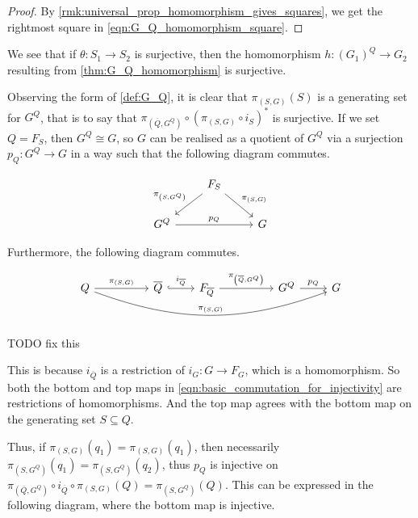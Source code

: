 \begin{proof}
	By \cref{rmk:universal_prop_homomorphism_gives_squares}, we get the rightmost square in \eqref{eqn:G_Q_homomorphism_square}.
\end{proof}

We see that if $\theta \colon S_1 \to S_2$ is surjective, then the homomorphism $h \colon (G_1)^Q \to G_2$ resulting from \cref{thm:G_Q_homomorphism} is surjective.

Observing the form of \cref{def:G_Q}, it is clear that $\pi_{(S,G)}(S)$ is a generating set for $G^Q$, that is to say that $\pi_{(\overline{Q},G^Q)} \circ \left(\pi_{(S,G)} \circ i_S \right)^*$ is surjective.
If we set $Q=F_S$, then $G^Q \cong G$, so $G$ can be realised as a quotient of $G^Q$ via a surjection $p_Q \colon G^Q \to G$ in a way such that the following diagram commutes.

\begin{equation*}
	\begin{tikzcd}
		& F_S \ar[dl, "\pi_{\left(S,G^Q\right)}"'] \ar[dr, "\pi_{\left(S,G\right)}"] &
		\\ G^Q \ar[rr, "p_Q"]  & & G
	\end{tikzcd}
\end{equation*}

Furthermore, the following diagram commutes.

\begin{equation}
	\begin{tikzcd}
		Q \ar[rr, "\pi_{(S,G)}"] \ar[rrrrrr, bend right=20, "\pi_{(S,G)}"] & & \overline{Q} \ar[r, hook, "i_{\overline{Q}}"] & F_{\overline{Q}} \ar[rr, "\pi_{\left(\overline{Q},G^Q\right)}"] & & G^Q \ar[r, "p_Q"] & G
	\end{tikzcd}
	\label{eqn:basic_commutation_for_injectivity}
\end{equation}

TODO fix this

This is because $i_{\overline{Q}}$ is a restriction of $i_G \colon G \to F_G$, which is a homomorphism.
So both the bottom and top maps in \eqref{eqn:basic_commutation_for_injectivity} are restrictions of homomorphisms.
And the top map agrees with the bottom map on the generating set $S \subseteq Q$.

Thus, if $\pi_{(S,G)}(q_1) = \pi_{(S,G)}(q_1)$, then necessarily $\pi_{\left(S,G^Q\right)}(q_1) = \pi_{\left( S,G^Q \right)}(q_2)$, thus $p_Q$ is injective on $\pi_{\left( \overline{Q},G^Q \right)} \circ i_{\overline{Q}} \circ \pi_{(S,G)}(Q) = \pi_{\left(S,G^Q\right)}(Q)$.
This can be expressed in the following diagram, where the bottom map is injective.

